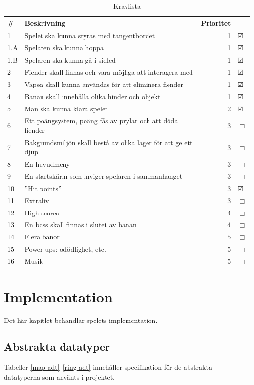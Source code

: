 \documentclass{scrartcl}
\begin{document}
\begin{table}[ht]
	\caption{Kravlista}\label{kravlista}
	\centering
	\begin{tabular}{lp{8cm}rl}
	\toprule
		\# & Beskrivning & Prioritet &  \\
	\midrule
	1 & Spelet ska kunna styras med tangentbordet &
		1 & $\CheckedBox$ \\
	1.A & Spelaren ska kunna hoppa &
		1 & $\CheckedBox$ \\
	1.B & Spelaren ska kunna gå i sidled &
		1 & $\CheckedBox$ \\
	2 & Fiender skall finnas och vara möjliga att interagera med &
		1 & $\CheckedBox$ \\
	3 & Vapen skall kunna användas för att eliminera fiender &
		1 & $\CheckedBox$ \\
	4 & Banan skall innehålla olika hinder och objekt  &
		1 & $\CheckedBox$ \\
	5 & Man ska kunna klara spelet &
		2 & $\CheckedBox$ \\
	6 & Ett poängsystem, poäng fås av prylar och att döda fiender &
		3 & $\Box$ \\
	7 & Bakgrundsmiljön skall bestå av olika lager för att ge ett djup &
		3 & $\Box$ \\
	8 & En huvudmeny &
		3 & $\Box$ \\
	9 & En startskärm som inviger spelaren i sammanhanget &
		3 & $\Box$ \\
	10 & ”Hit points” &
		3 & $\CheckedBox$ \\
	11 & Extraliv &
		3 & $\Box$ \\
	12 & High scores &
		4 & $\Box$ \\
	13 & En boss skall finnas i slutet av banan &
		4 & $\Box$ \\
	14 & Flera banor &
		5 & $\Box$ \\
	15 & Power-ups: odödlighet, etc. &
		5 & $\Box$ \\
	16 & Musik &
		5 & $\Box$ \\

	\bottomrule
	\end{tabular}
\end{table}

\section{Implementation}
Det här kapitlet behandlar spelets implementation.

\subsection{Abstrakta datatyper}
Tabeller \ref{map-adt}--\ref{ring-adt} innehåller specifikation för de abstrakta datatyperna som använts i projektet.
\end{document}
